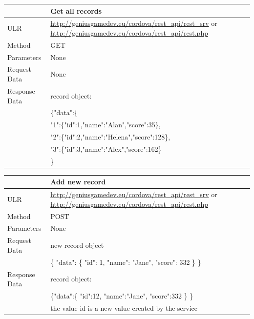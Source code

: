 \begin{tabularx}{\textwidth}{|l|X|}
\hline
&\textbf{Get all records}\\\hline
ULR &   \url{http://geniusgamedev.eu/cordova/rest_api/rest_srv} or \url{http://geniusgamedev.eu/cordova/rest_api/rest.php}\\\hline
Method  & GET\\\hline
Parameters  & None \\\hline
Request Data & None\\\hline
Response Data & record object:\\
&
\{"data":\{\\
&"1":\{"id":1,"name":"Alan","score":35\},\\
&"2":\{"id":2,"name":"Helena","score":128\},\\
&"3":\{"id":3,"name":"Alex","score":162\}\\
&\}
\\\hline
\end{tabularx}

\begin{tabularx}{\textwidth}{|l|X|}
\hline
&\textbf{Add new record}\\\hline
ULR &   \url{http://geniusgamedev.eu/cordova/rest_api/rest_srv} or \url{http://geniusgamedev.eu/cordova/rest_api/rest.php}\\\hline
Method  & POST\\\hline
Parameters  & None \\\hline
Request Data & new record object\\
&\{
"data": \{
"id": 1,
"name": "Jane",
"score": 332
\}
\}
\\\hline
Response Data & record object:\\
&
\{"data":\{
    "id":12,
    "name":"Jane",
    "score":332
    \}
\}
\\
&the value id is a new value created by the service
\\\hline
\end{tabularx}

